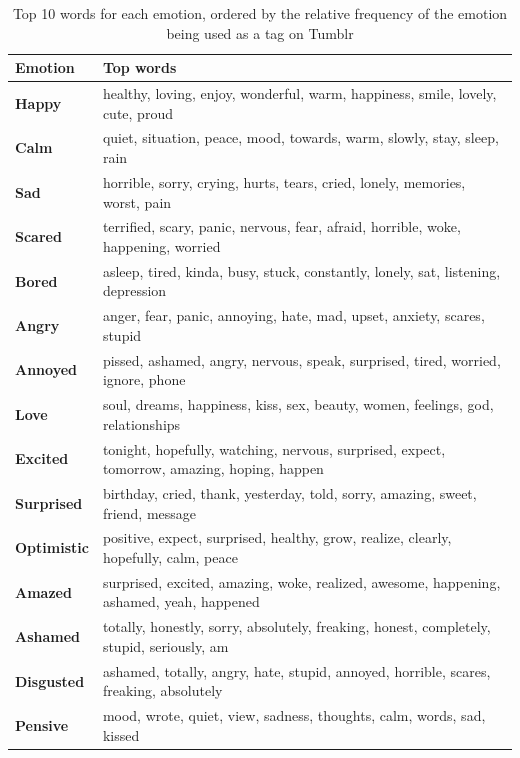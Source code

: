 \documentclass{article} %
\begin{document}
\begin{table}[H]
\caption{Top 10 words for each emotion, ordered by the relative frequency of the emotion being used as a tag on Tumblr}
\begin{center}
    \begin{tabular}{ l | l}
    Emotion & Top words\\
    \hline
    \textbf{Happy} & healthy, loving, enjoy, wonderful, warm, happiness, smile, lovely, cute, proud\\
    \textbf{Calm} & quiet, situation, peace, mood, towards, warm, slowly, stay, sleep, rain\\
    \textbf{Sad} & horrible, sorry, crying, hurts, tears, cried, lonely, memories, worst, pain\\
    \textbf{Scared} & terrified, scary, panic, nervous, fear, afraid, horrible, woke, happening, worried\\
    \textbf{Bored} & asleep, tired, kinda, busy, stuck, constantly, lonely, sat, listening, depression\\
    \textbf{Angry} & anger, fear, panic, annoying, hate, mad, upset, anxiety, scares, stupid\\
    \textbf{Annoyed} & pissed, ashamed, angry, nervous, speak, surprised, tired, worried, ignore, phone\\
    \textbf{Love} & soul, dreams, happiness, kiss, sex, beauty, women, feelings, god, relationships \\
    \textbf{Excited} & tonight, hopefully, watching, nervous, surprised, expect, tomorrow, amazing, hoping, happen\\
    \textbf{Surprised} & birthday, cried, thank, yesterday, told, sorry, amazing, sweet, friend,  message\\
    \textbf{Optimistic} & positive, expect, surprised, healthy, grow, realize, clearly, hopefully, calm, peace\\
    \textbf{Amazed} & surprised, excited, amazing, woke, realized, awesome, happening, ashamed, yeah, happened\\
    \textbf{Ashamed} & totally, honestly, sorry, absolutely, freaking, honest, completely, stupid, seriously, am\\
    \textbf{Disgusted} & ashamed, totally, angry, hate, stupid, annoyed, horrible, scares, freaking, absolutely\\
    \textbf{Pensive} & mood, wrote, quiet, view, sadness, thoughts, calm, words, sad, kissed\\
    \end{tabular}
\end{center} 
\label{top-words}
\end{table}
\end{document}
